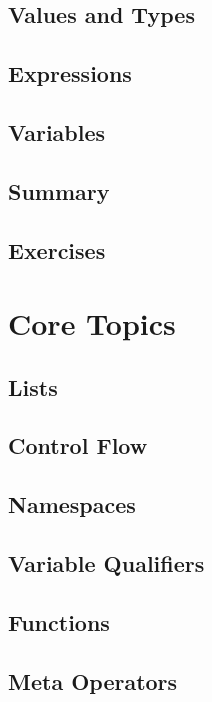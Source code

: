 \documentclass[oneside]{book}
\begin{document}
\section{Values and Types}
\blindtext

\section{Expressions}
\blindtext

\section{Variables}
\blindtext

\section{Summary}
\blindtext

\section{Exercises}
\blindtext

\chapter{Core Topics}
\blindtext

\section{Lists}
\blindtext

\section{Control Flow}
\blindtext

\section{Namespaces}
\blindtext

\section{Variable Qualifiers}
\blindtext

\section{Functions}
\blindtext

\section{Meta Operators}
\blindtext
\end{document}
